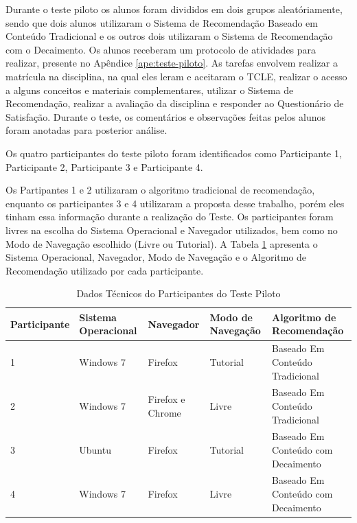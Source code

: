 Durante o teste piloto os alunos foram divididos em dois grupos aleatóriamente, sendo que dois alunos utilizaram o Sistema de Recomendação
Baseado em Conteúdo Tradicional e os outros dois utilizaram o Sistema de Recomendação com o Decaimento. Os alunos receberam
um protocolo de atividades para realizar, presente no Apêndice \ref{ape:teste-piloto}. As tarefas envolvem
realizar a matrícula na disciplina, na qual eles leram e aceitaram o TCLE, realizar o acesso a alguns conceitos e
materiais complementares, utilizar o Sistema de Recomendação, realizar a avaliação da disciplina e responder ao Questionário
de Satisfação. Durante o teste, os comentários e observações feitas pelos alunos foram anotadas para posterior análise.

Os quatro participantes do teste piloto foram identificados como Participante 1, Participante 2,
Participante 3 e Participante 4.

Os Partipantes 1 e 2 utilizaram o algoritmo tradicional de recomendação, enquanto os participantes 3 e 4 utilizaram a
proposta desse trabalho, porém eles tinham essa informação durante a realização do Teste. Os participantes foram livres na escolha do Sistema Operacional e Navegador utilizados, bem como
no Modo de Navegação escolhido (Livre ou Tutorial). A Tabela \ref{tab:participantes-teste-piloto} apresenta o
Sistema Operacional, Navegador, Modo de Navegação e o Algoritmo de Recomendação utilizado por
cada participante.

\begin{table}[h]
\footnotesize
\caption[Dados Técnicos do Participantes do Teste Piloto]{Dados Técnicos do Participantes do Teste Piloto}
\label{tab:participantes-teste-piloto}
\centering
\begin{tabular}{|p{2cm}|p{2.5cm}|p{2.5cm}|p{2.5cm}|p{2.5cm}|}
  \hline
  \textbf{Participante} & \textbf{Sistema Operacional} & \textbf{Navegador} & \textbf{Modo de Navegação} & \textbf{Algoritmo de Recomendação} \\
  \hline
  1 & Windows 7 & Firefox & Tutorial & Baseado Em Conteúdo Tradicional \\
  \hline
  2 & Windows 7 & Firefox e Chrome & Livre & Baseado Em Conteúdo Tradicional \\
  \hline
  3 & Ubuntu & Firefox & Tutorial & Baseado Em Conteúdo com Decaimento \\
  \hline
  4 & Windows 7 & Firefox & Livre & Baseado Em Conteúdo com Decaimento \\
  \hline
\end{tabular}
\end{table}

